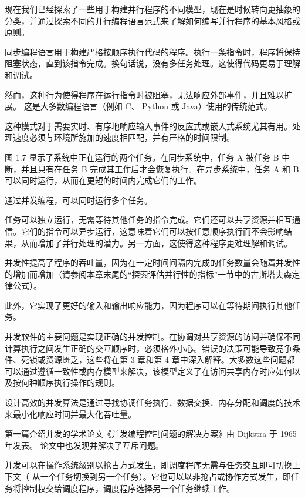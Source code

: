 现在我们已经探索了一些用于构建并行程序的不同模型，现在是时候转向更抽象的分类，并通过探索不同的并行编程语言范式来了解如何编写并行程序的基本风格或原则。


同步编程语言用于构建严格按顺序执行代码的程序。执行一条指令时，程序将保持阻塞状态，直到该指令完成。换句话说，没有多任务处理。这使得代码更易于理解和调试。

然而，这种行为使得程序在运行指令时被阻塞，无法响应外部事件，并且难以扩展。
这是大多数编程语言（例如 C、 Python 或 Java）使用的传统范式。

这种模式对于需要实时、有序地响应输入事件的反应式或嵌入式系统尤其有用。处理速度必须与环境所施加的速度相匹配，并有严格的时间限制。


图 1.7 显示了系统中正在运行的两个任务。在同步系统中，任务 A 被任务 B 中断，并且只有在任务 B 完成其工作后才会恢复执行。在异步系统中，任务 A 和 B 可以同时运行，从而在更短的时间内完成它们的工作。


通过并发编程，可以同时运行多个任务。

任务可以独立运行，无需等待其他任务的指令完成。它们还可以共享资源并相互通信。它们的指令可以异步运行，这意味着它们可以按任意顺序执行而不会影响结果，从而增加了并行处理的潜力。另一方面，这使得这种程序更难理解和调试。

并发性提高了程序的吞吐量，因为在一定时间间隔内完成的任务数量会随着并发性的增加而增加（请参阅本章末尾的“探索评估并行性的指标”一节中的古斯塔夫森定律公式）。

此外，它实现了更好的输入和输出响应能力，因为程序可以在等待期间执行其他任务。

并发软件的主要问题是实现正确的并发控制。在协调对共享资源的访问并确保不同计算执行之间发生正确的交互顺序时，必须格外小心。错误的决策可能导致竞争条件、死锁或资源匮乏，这些将在第 3 章和第 4 章中深入解释。大多数这些问题都可以通过遵循一致性或内存模型来解决，该模型定义了在访问共享内存时应如何以及按何种顺序执行操作的规则。

设计高效的并发算法是通过寻找协调任务执行、数据交换、内存分配和调度的技术来最小化响应时间并最大化吞吐量。

第一篇介绍并发的学术论文《并发编程控制问题的解决方案》由 Dijkstra 于 1965 年发表。
论文中也发现并解决了互斥问题。

并发可以在操作系统级别以抢占方式发生，即调度程序无需与任务交互即可切换上下文（ 从一个任务切换到另一个任务）。它也可以以非抢占或协作方式发生，即任务将控制权交给调度程序，调度程序选择另一个任务继续工作。

